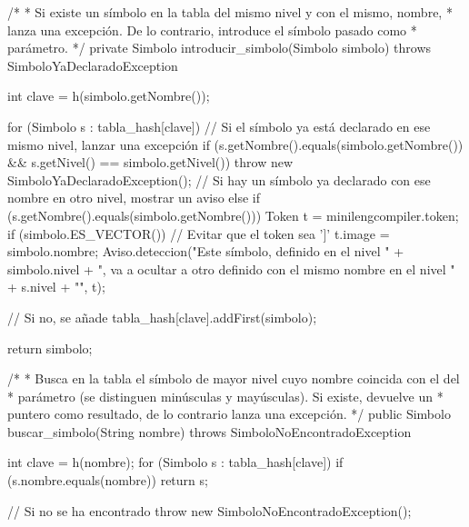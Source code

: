 \begin{codigo}[style=java,caption={Función \url{lib.semantico.TablaSimbolos.introducir_simbolo}},label={introducir}]
/*
 * Si existe un símbolo en la tabla del mismo nivel y con el mismo, nombre,
 * lanza una excepción. De lo contrario, introduce el símbolo pasado como
 * parámetro.
 */
private Simbolo introducir_simbolo(Simbolo simbolo) throws SimboloYaDeclaradoException {
    int clave = h(simbolo.getNombre());

    for (Simbolo s : tabla_hash[clave]) {
        // Si el símbolo ya está declarado en ese mismo nivel, lanzar una excepción
        if (s.getNombre().equals(simbolo.getNombre()) && s.getNivel() == simbolo.getNivel()) {
            throw new SimboloYaDeclaradoException();
        }
        // Si hay un símbolo ya declarado con ese nombre en otro nivel, mostrar un aviso
        else if (s.getNombre().equals(simbolo.getNombre())) {
            Token t = minilengcompiler.token;
            if (simbolo.ES_VECTOR()) {
                // Evitar que el token sea ']'
                t.image = simbolo.nombre;
            }
            Aviso.deteccion("Este símbolo, definido en el nivel " + simbolo.nivel +
                    ", va a ocultar a otro definido con el mismo nombre en el nivel " + s.nivel + "",
                    t);
        }
    }

    // Si no, se añade
    tabla_hash[clave].addFirst(simbolo);

    return simbolo;
}
\end{codigo}


\begin{codigo}[style=java,caption={Función \url{lib.semantico.TablaSimbolos.buscar_simbolo}},label={buscar}]
/*
 * Busca en la tabla el símbolo de mayor nivel cuyo nombre coincida con el del
 * parámetro (se distinguen minúsculas y mayúsculas). Si existe, devuelve un
 * puntero como resultado, de lo contrario lanza una excepción.
 */
public Simbolo buscar_simbolo(String nombre) throws SimboloNoEncontradoException {
    int clave = h(nombre);
    for (Simbolo s : tabla_hash[clave]) {
        if (s.nombre.equals(nombre)) {
            return s;
        }
    }

    // Si no se ha encontrado
    throw new SimboloNoEncontradoException();
}
\end{codigo}
